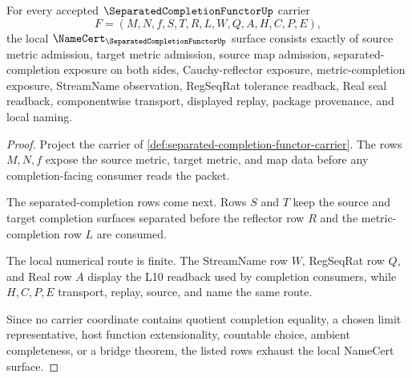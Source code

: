 \begin{theorem}
\label{thm:separated-completion-functor-namecert-obligations}
For every accepted $\SeparatedCompletionFunctorUp$ carrier
$$
F=(M,N,f,S,T,R,L,W,Q,A,H,C,P,E),
$$
the local $\NameCert_{\SeparatedCompletionFunctorUp}$ surface consists exactly of source metric admission, target metric admission, source map admission, separated-completion exposure on both sides, Cauchy-reflector exposure, metric-completion exposure, StreamName observation, RegSeqRat tolerance readback, Real seal readback, componentwise transport, displayed replay, package provenance, and local naming.
\end{theorem}
\begin{proof}
Project the carrier of \autoref{def:separated-completion-functor-carrier}. The rows $M,N,f$ expose the source metric, target metric, and map data before any completion-facing consumer reads the packet.

The separated-completion rows come next. Rows $S$ and $T$ keep the source and target completion surfaces separated before the reflector row $R$ and the metric-completion row $L$ are consumed.

The local numerical route is finite. The StreamName row $W$, RegSeqRat row $Q$, and Real row $A$ display the L10 readback used by completion consumers, while $H,C,P,E$ transport, replay, source, and name the same route.

Since no carrier coordinate contains quotient completion equality, a chosen limit representative, host function extensionality, countable choice, ambient completeness, or a bridge theorem, the listed rows exhaust the local NameCert surface.
\end{proof}

